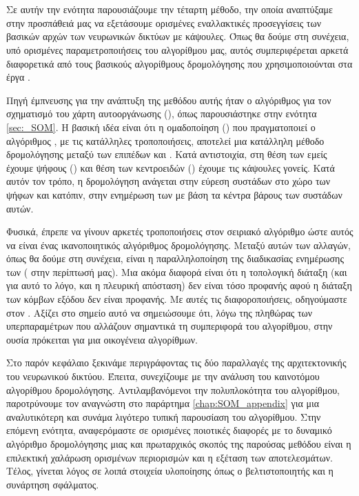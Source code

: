 \section{}

Σε αυτήν την ενότητα παρουσιάζουμε την τέταρτη μέθοδο, την οποία αναπτύξαμε στην προσπάθειά μας να εξετάσουμε ορισμένες εναλλακτικές προσεγγίσεις των βασικών αρχών των νευρωνικών δικτύων με κάψουλες. Όπως θα δούμε στη συνέχεια, υπό ορισμένες παραμετροποιήσεις του αλγορίθμου μας, αυτός συμπεριφέρεται αρκετά διαφορετικά από τους βασικούς αλγορίθμους δρομολόγησης που χρησιμοποιούνται στα έργα \cite{sabour2017dynamic,hinton2018matrix}.\par

Πηγή έμπνευσης για την ανάπτυξη της μεθόδου αυτής ήταν ο αλγόριθμος για τον σχηματισμό του χάρτη αυτο\textendash οργάνωσης (), όπως παρουσιάστηκε στην ενότητα \ref{sec:_SOM}. Η βασική ιδέα είναι ότι η ομαδοποίηση () που πραγματοποιεί ο αλγόριθμος , με τις κατάλληλες τροποποιήσεις, αποτελεί μια κατάλληλη μέθοδο δρομολόγησης μεταξύ των επιπέδων  και . Κατά αντιστοιχία, στη θέση των  εμείς έχουμε ψήφους () και  θέση των κεντροειδών () έχουμε τις κάψουλες γονείς. Κατά αυτόν τον τρόπο, η δρομολόγηση ανάγεται στην εύρεση συστάδων στο χώρο των ψήφων και κατόπιν, στην ενημέρωση των  με βάση τα κέντρα βάρους των συστάδων αυτών.\par

Φυσικά, έπρεπε να γίνουν αρκετές τροποποιήσεις στον σειριακό αλγόριθμο  ώστε αυτός να είναι ένας ικανοποιητικός αλγόριθμος δρομολόγησης. Μεταξύ αυτών των αλλαγών, όπως θα δούμε στη συνέχεια, είναι η παραλληλοποίηση της διαδικασίας ενημέρωσης των  ( στην περίπτωσή μας). Μια ακόμα διαφορά είναι ότι η τοπολογική διάταξη (και για αυτό το λόγο, και η πλευρική απόσταση) δεν είναι τόσο προφανής αφού η διάταξη των κόμβων εξόδου δεν είναι προφανής. Με αυτές τις διαφοροποιήσεις, οδηγούμαστε στον . Αξίζει στο σημείο αυτό να σημειώσουμε ότι, λόγω της πληθώρας των υπερπαραμέτρων που αλλάζουν σημαντικά τη συμπεριφορά του αλγορίθμου, στην ουσία πρόκειται για μια οικογένεια αλγορίθμων.\par

Στο παρόν κεφάλαιο ξεκινάμε περιγράφοντας τις δύο παραλλαγές της αρχιτεκτονικής του νευρωνικού δικτύου. Έπειτα, συνεχίζουμε με την ανάλυση του καινοτόμου αλγορίθμου δρομολόγησης. Αντιλαμβανόμενοι την πολυπλοκότητα του αλγορίθμου, παροτρύνουμε τον αναγνώστη στο παράρτημα \ref{chap:SOM_appendix} για μια αναλυτικότερη και συνάμα λιγότερο τυπική παρουσίαση του αλγορίθμου. Στην επόμενη ενότητα, αναφερόμαστε σε ορισμένες ποιοτικές διαφορές με το δυναμικό αλγόριθμο δρομολόγησης μιας και πρωταρχικός σκοπός της παρούσας μεθόδου είναι η επιλεκτική χαλάρωση ορισμένων περιορισμών και η εξέταση των αποτελεσμάτων. Τέλος, γίνεται λόγος σε λοιπά στοιχεία υλοποίησης όπως ο βελτιστοποιητής και η συνάρτηση σφάλματος. 

